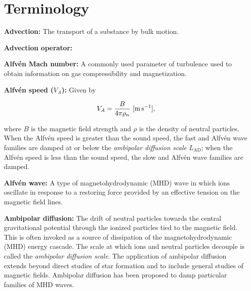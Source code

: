 \documentclass[a4paper,11pt]{article}
\begin{document}

\newpage
\section{Terminology}

{\noindent}\textbf{Advection:} The transport of a substance by bulk motion.

{\noindent}\textbf{Advection operator:}

{\noindent}\textbf{Alfv\'en Mach number:} A commonly used parameter of turbulence used to obtain information on gas compressibility and magnetization.

{\noindent}\textbf{Alfv\'en speed ($V_A$):} Given by

\begin{align*}
    V_A = \frac{B}{4\pi\rho_n} ~ [{\rm m\,s^{-1}}],
\end{align*}

{\noindent}where $B$ is the magnetic field strength and $\rho$ is the density of neutral particles. When the Alfv\'en speed is greater than the sound speed, the fast and Alfv\'en wave families are damped at or below the \textit{ambipolar diffusion scale} $L_\mathrm{AD}$; when the Alfv\'en speed is less than the sound speed, the slow and Alfv\'en wave families are damped.

{\noindent}\textbf{Alfv\'en wave:} A type of magnetohydrodynamic (MHD) wave in which ions oscillate in response to a restoring force provided by an effective tension on the magnetic field lines.

{\noindent}\textbf{Ambipolar diffusion:} The drift of neutral particles towards the central gravitational potential through the ionized particles tied to the magnetic field. This is often invoked as a source of dissipation of the magnetohydrodynamic (MHD) energy cascade. The scale at which ions and neutral particles decouple is called the \textit{ambipolar diffusion scale}. The application of ambipolar diffusion extends beyond direct studies of star formation and to include general studies of magnetic fields. Ambipolar diffusion has been proposed to damp particular families of MHD waves. 
\end{document}
